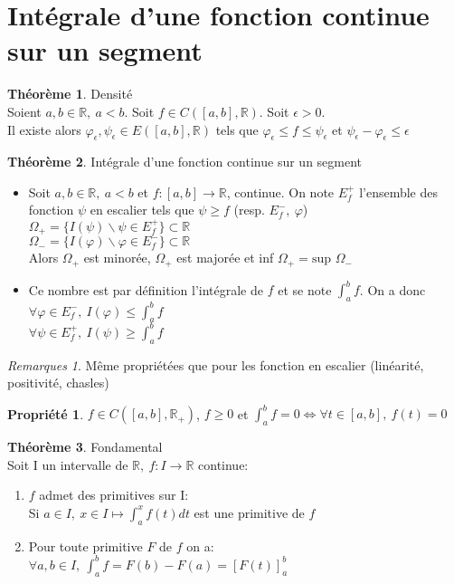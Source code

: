 \documentclass[fleqn]{article}
\theoremstyle{definition} \newtheorem*{defi}{D\'efinition}
\theoremstyle{definition} \newtheorem*{theo}{Th\'eor\`eme}
\theoremstyle{definition} \newtheorem*{coro}{Corollaire}
\theoremstyle{remark} \newtheorem*{rqs}{Remarques}
\theoremstyle{definition} \newtheorem*{prop}{Propri\'et\'e}
\begin{document}
\section{Int\'egrale d'une fonction continue sur un segment}
\begin{theo} Densit\'e \\
	Soient $a,b \in \mathbb{R},\ a < b$. Soit $f \in C([a,b], \mathbb{R})$. Soit $\epsilon > 0$. \\
	Il existe alors $\varphi_{\epsilon}, \psi_{\epsilon} \in E([a,b], \mathbb{R})$ tels que $\varphi_{\epsilon} \leq f \leq \psi_{\epsilon}$
	et $\psi_{\epsilon} - \varphi_{\epsilon} \leq \epsilon$
\end{theo}

\begin{theo} Int\'egrale d'une fonction continue sur un segment
	\begin{itemize}
		\item Soit $a,b \in \mathbb{R},\ a<b$ et $f:[a,b] \rightarrow \mathbb{R}$, continue. On note $E_f^+$ l'ensemble des fonction $\psi$
			en escalier tels que $\psi \geq f$ (resp. $E_f^-,\ \varphi$) \\
			$\Omega_+ = \{I(\psi) \backslash \psi \in E_f^+\} \subset \mathbb{R}$ \\
			$\Omega_- = \{I(\varphi) \backslash \varphi \in E_f^-\} \subset \mathbb{R}$ \\
			Alors $\Omega_+$ est minor\'ee, $\Omega_+$ est major\'ee et inf $\Omega_+ = \text{sup }\Omega_-$
		\item Ce nombre est par d\'efinition l'int\'egrale de $f$ et se note $\int_a^b f$. On a donc\\
			$\forall \varphi \in E_f^-,\ I(\varphi) \leq \int_a^b f$\\
			$\forall \psi \in E_f^+,\ I(\psi) \geq \int_a^b f$
	\end{itemize}
\end{theo}

\begin{rqs} M\^eme propri\'et\'ees que pour les fonction en escalier (lin\'earit\'e, positivit\'e, chasles)
\end{rqs}

\begin{prop} $f \in C([a,b], \mathbb{R}_+)$, $f \geq 0$ et $\int_a^b f = 0 \Leftrightarrow \forall t \in [a,b],\ f(t) = 0$
\end{prop}

\begin{theo} Fondamental \\
	Soit I un intervalle de $\mathbb{R},\ f:I\rightarrow \mathbb{R}$ continue:
	\begin{enumerate}
		\item $f$ admet des primitives sur I: \\
			Si $a \in I,\ x \in I \mapsto \int_a^x f(t)dt$ est une primitive de $f$
		\item Pour toute primitive $F$ de $f$ on a: \\
			$\forall a,b \in I,\ \int_a^b f = F(b) - F(a) = [F(t)]_a^b$
	\end{enumerate}
\end{theo}
\end{document}
